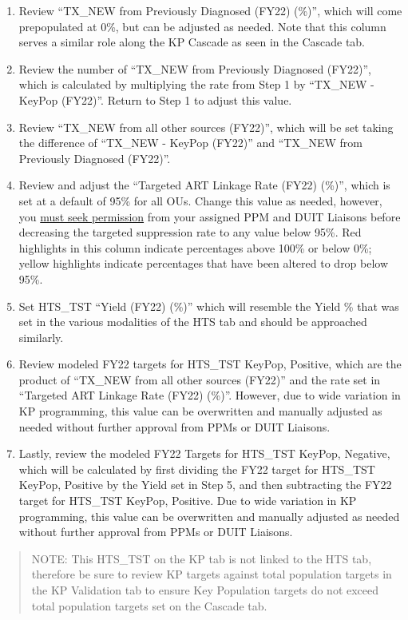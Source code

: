 \documentclass[
  openany]{book}
\begin{document}
\begin{enumerate}
\def\labelenumi{\arabic{enumi}.}
\item
  Review ``TX\_NEW from Previously Diagnosed (FY22) (\%)'', which will
  come prepopulated at 0\%, but can be adjusted as needed. Note that
  this column serves a similar role along the KP Cascade as seen in
  the Cascade tab.
\item
  Review the number of ``TX\_NEW from Previously Diagnosed (FY22)'',
  which is calculated by multiplying the rate from Step 1 by ``TX\_NEW -
  KeyPop (FY22)''. Return to Step 1 to adjust this value.
\item
  Review ``TX\_NEW from all other sources (FY22)'', which will be set
  taking the difference of ``TX\_NEW - KeyPop (FY22)'' and ``TX\_NEW from
  Previously Diagnosed (FY22)''.
\item
  Review and adjust the ``Targeted ART Linkage Rate (FY22) (\%)'', which
  is set at a default of 95\% for all OUs. Change this value as needed,
  however, you \underline{must seek permission} from your assigned PPM and
  DUIT Liaisons before decreasing the targeted suppression rate to any
  value below 95\%. Red highlights in this column indicate percentages
  above 100\% or below 0\%; yellow highlights indicate percentages that
  have been altered to drop below 95\%.
\item
  Set HTS\_TST ``Yield (FY22) (\%)'' which will resemble the Yield \% that
  was set in the various modalities of the HTS tab and should be
  approached similarly.
\item
  Review modeled FY22 targets for HTS\_TST KeyPop, Positive, which are
  the product of ``TX\_NEW from all other sources (FY22)'' and the rate
  set in ``Targeted ART Linkage Rate (FY22) (\%)''. However, due to wide
  variation in KP programming, this value can be overwritten and
  manually adjusted as needed without further approval from PPMs or
  DUIT Liaisons.
\item
  Lastly, review the modeled FY22 Targets for HTS\_TST KeyPop,
  Negative, which will be calculated by first dividing the FY22 target
  for HTS\_TST KeyPop, Positive by the Yield set in Step 5, and then
  subtracting the FY22 target for HTS\_TST KeyPop, Positive. Due to
  wide variation in KP programming, this value can be overwritten and
  manually adjusted as needed without further approval from PPMs or
  DUIT Liaisons.
\end{enumerate}

\begin{quote}
NOTE: This HTS\_TST on the KP tab is not linked to the HTS tab,
therefore be sure to review KP targets against total population
targets in the KP Validation tab to ensure Key Population targets do
not exceed total population targets set on the Cascade tab.
\end{quote}
\end{document}

